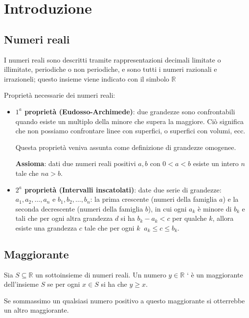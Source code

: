 \documentclass[a4paper]{article}
\theoremstyle{break}
\theoremstyle{break}
\theoremstyle{break}
\theoremstyle{break}
\begin{document}


\tableofcontents
\pagebreak

\section{Introduzione}


\subsection{Numeri reali}
I numeri reali sono descritti tramite rappresentazioni decimali limitate o illimitate, periodiche
o non periodiche, e sono tutti i numeri razionali e irrazioneli; questo insieme viene indicato con
il simbolo \( \mathbb{R} \)

Proprietà necessarie dei numeri reali:
\begin{itemize}
  \item \textbf{\( 1^a \) proprietà (Eudosso-Archimede)}: due grandezze sono confrontabili quando esiste
    un multiplo della minore che supera la maggiore. Ciò significa che non possiamo confrontare
    linee con superfici, o superfici con volumi, ecc.

    Questa proprietà veniva assunta come definizione di grandezze omogenee.

    \textbf{Assioma}: dati due numeri reali positivi \( a, b \) con \( 0 < a < b \) esiste un
    intero \( n \) tale che \( na > b \).
  \item \textbf{\( 2^a \) proprietà (Intervalli inscatolati)}: date due serie di grandezze:
    \( a_1, a_2, \ldots, a_n \)
    e \( b_1, b_2, \ldots, b_n \): la prima crescente (numeri della famiglia \( a \)) e la seconda
    decrescente (numeri della famiglia \( b \)), in cui ogni \( a_k \) è minore di \( b_k \) e tali
    che per ogni altra grandezza \( d \) si ha \( b_k - a_k < c \) per qualche \( k \), allora
    esiste una grandezza \( c \) tale che per ogni \( k\;\; a_k \le c \le b_k \).
\end{itemize}


\subsection{Maggiorante}
\begin{definition}
  Sia \( S \subseteq \mathbb{R} \) un sottoinsieme di numeri reali. Un numero \( y \in \mathbb{R} \) `
  è un maggiorante dell'insieme \( S \) se per ogni \( x \in S \) si ha che \( y \ge x \).
\end{definition}
Se sommassimo un qualsiasi numero positivo a questo maggiorante si otterrebbe un altro maggiorante.
\end{document}
